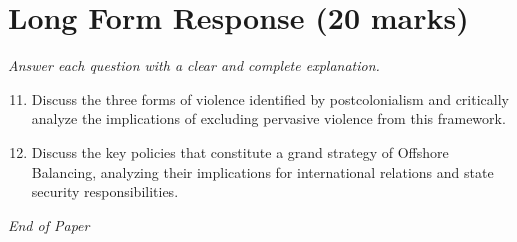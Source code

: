 \documentclass[12pt]{article}
\begin{document}
\section*{Long Form Response (20 marks)}
\textit{Answer each question with a clear and complete explanation.}
\begin{enumerate}[label=\arabic*.]
\setcounter{enumi}{10}
\item Discuss the three forms of violence identified by postcolonialism and critically analyze the implications of excluding pervasive violence from this framework.
\item Discuss the key policies that constitute a grand strategy of Offshore Balancing, analyzing their implications for international relations and state security responsibilities.
\end{enumerate}

\vfill
\noindent\textit{End of Paper}
\end{document}
